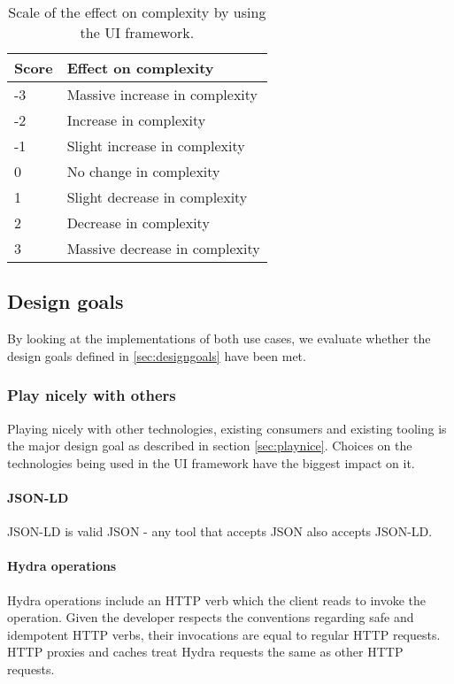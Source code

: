 \begin{table}[!htb]
  \begin{center}
    \begin{tabular}{|l|l|}
      \hline
      \textbf{Score} & \textbf{Effect on complexity} \\
      \hline
      -3 & Massive increase in complexity \\
      \hline
      -2 & Increase in complexity \\
      \hline
      -1 & Slight increase in complexity \\
      \hline
      0 & No change in complexity \\
      \hline
      1 & Slight decrease in complexity \\
      \hline
      2 & Decrease in complexity \\
      \hline
      3 & Massive decrease in complexity \\
      \hline
    \end{tabular}
    \caption{Scale of the effect on complexity by using the UI framework.}
    \label{tab:complexityscore}
  \end{center}
\end{table}

\subsection{Design goals}
By looking at the implementations of both use cases, we evaluate whether the design goals defined in \ref{sec:designgoals} have been met.

\subsubsection{Play nicely with others}
Playing nicely with other technologies, existing consumers and existing tooling is the major design goal as described in section \ref{sec:playnice}. Choices on the technologies being used in the UI framework have the biggest impact on it.

\paragraph{JSON-LD}
JSON-LD is valid JSON - any tool that accepts JSON also accepts JSON-LD.

\paragraph{Hydra operations}
Hydra operations include an  HTTP verb which the client reads to invoke the operation. Given the developer respects the conventions regarding safe and idempotent HTTP verbs, their invocations are equal to regular HTTP requests. HTTP proxies and caches treat Hydra requests the same as other HTTP requests.

